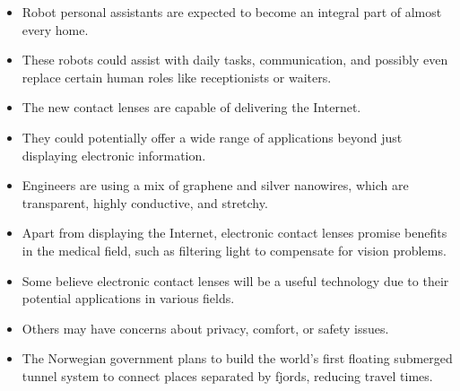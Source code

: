 \begin{itemize}
      \item Robot personal assistants are expected to become an integral part of almost every home.
      \item These robots could assist with daily tasks, communication, and possibly even replace certain human roles like receptionists or waiters.
\end{itemize}

\begin{itemize}
      \item The new contact lenses are capable of delivering the Internet.
      \item They could potentially offer a wide range of applications beyond just displaying electronic information.
\end{itemize}

\begin{itemize}
      \item Engineers are using a mix of graphene and silver nanowires, which are transparent, highly conductive, and stretchy.
\end{itemize}

\begin{itemize}
      \item Apart from displaying the Internet, electronic contact lenses promise benefits in the medical field, such as filtering light to compensate for vision problems.
\end{itemize}

\begin{itemize}
      \item Some believe electronic contact lenses will be a useful technology due to their potential applications in various fields.
      \item Others may have concerns about privacy, comfort, or safety issues.
\end{itemize}

\begin{itemize}
      \item The Norwegian government plans to build the world's first floating submerged tunnel system to connect places separated by fjords, reducing travel times.
\end{itemize}

